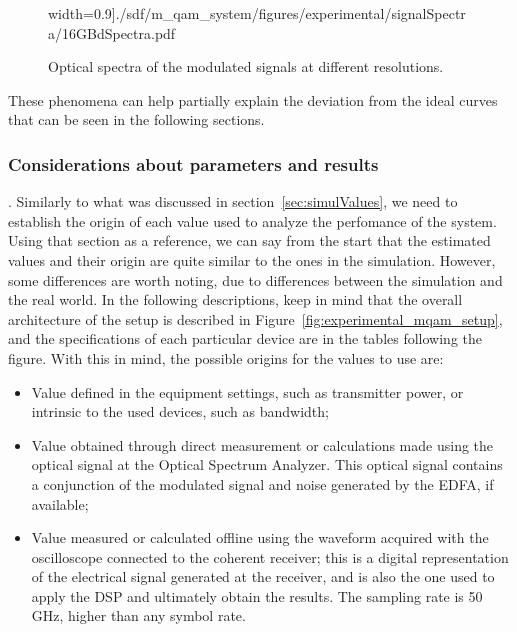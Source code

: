 \begin{figure}[H]
\begin{minipage}{0.45\textwidth}
			width=0.9\textwidth]{./sdf/m_qam_system/figures/experimental/signalSpectra/16GBdSpectra.pdf}
			\subcaption{\label{fig:opt16gbres}}
		\end{minipage}
		\caption{Optical spectra of the modulated signals at different resolutions.\label{fig:optvarres}}
	\end{figure}


	These phenomena can help partially explain the deviation from the ideal curves
	that can be seen in the following sections.

	\subsubsection{Considerations about parameters and
	results}\label{sec:expValues}.
	Similarly to what was discussed in section~\ref{sec:simulValues}, we need to
	establish the origin of each value used to analyze the perfomance of the
	system. Using that section as a reference, we can say from the start that the
	estimated values and their origin are quite similar to the ones in the
	simulation. However, some differences are worth noting, due to differences
	between the simulation and the real world.
	In the following descriptions, keep in mind that the overall architecture of
	the setup is described in Figure~\ref{fig:experimental_mqam_setup}, and the
	specifications of each particular device are in the tables following the
	figure. With this in mind, the possible origins for the values to use are:


	\begin{itemize}
		\item Value defined in the equipment settings, such as transmitter power, or
			intrinsic to the used devices, such as bandwidth;
		\item Value obtained through direct measurement or calculations made using
			the optical signal at the Optical Spectrum Analyzer. This optical signal
			contains a conjunction of the modulated signal and noise generated by the
			EDFA, if available;
		\item Value measured or calculated offline using the waveform acquired
			with the oscilloscope connected to the coherent receiver; this is
			a digital representation of the electrical signal generated at the
			receiver, and is also the one used to apply the DSP and ultimately obtain
			the results. The sampling rate is 50 GHz, higher than any symbol rate.
	\end{itemize}

